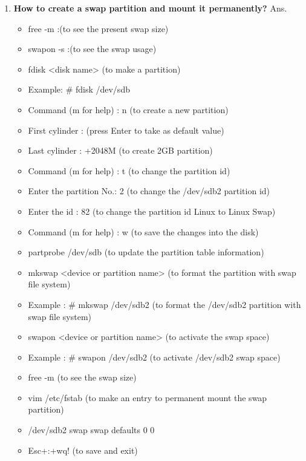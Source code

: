 \begin{enumerate}
\begin{enumerate}
  \item \textbf{How to create a swap partition and mount it permanently?}
  \newline
  Ans.\begin{itemize}
        \item free   -m  :(to see the present swap size)
        \item swapon  -s   :(to see the swap usage)
        \item fdisk   <disk name>	(to make a partition)
        \item Example:  # fdisk   /dev/sdb
        \item Command (m for help) :  n    (to create a new partition)
        \item First cylinder :  (press Enter to take as default value)
        \item Last cylinder :  +2048M   (to create 2GB partition)
        \item Command (m for help) :   t     (to change the partition id)
        \item Enter the partition No.:  2      (to change the /dev/sdb2 partition id)
        \item Enter the id :  82    (to change the partition id Linux to Linux Swap)
        \item Command (m for help) :  w    (to save the changes into the disk)
        \item partprobe  /dev/sdb        (to update the partition table information)
        \item mkswap  <device or partition name>     (to  format the partition with swap file system)
        \item Example :  # mkswap   /dev/sdb2        (to format the /dev/sdb2 partition with swap file system)
        \item swapon    <device or partition name>     (to activate the swap space)
        \item Example :  # swapon   /dev/sdb2       (to activate /dev/sdb2  swap space)
        \item free   -m       (to see the swap size)
        \item vim /etc/fstab	   (to make an entry to permanent mount the swap partition)
        \item /dev/sdb2		swap	swap	defaults	0	0
        \item Esc+:+wq!     (to save and exit)
  \end{itemize}

  \bigskip
  \bigskip


\end{enumerate}
\end{enumerate}
